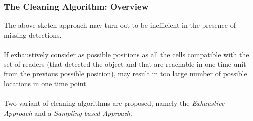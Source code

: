 
\begin{frame}
\frametitle{The Cleaning Algorithm: Overview}

The above-sketch approach may turn out to be inefficient in the presence of missing detections.\\~\\

If exhaustively consider as possible positions as all the cells compatible with the set of readers (that detected the object and that are reachable in one time unit from the previous possible position), may result in too large number of possible locations in one time point. \\~\\

Two variant of cleaning algorithms are proposed, namely the \emph{Exhaustive Approach} and a \emph{Sampling-based Approach}.

\end{frame}


